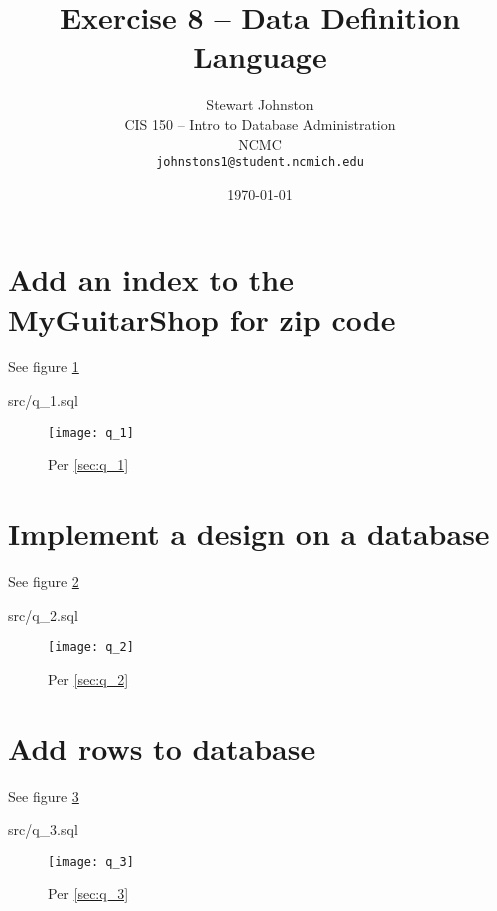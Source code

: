 \documentclass{article}
\title{Exercise 8 -- Data Definition Language}
\author{Stewart Johnston\\
  {CIS 150 -- Intro to Database Administration}\\
  {NCMC}\\
  {\texttt{johnstons1@student.ncmich.edu}}
}
\date{\today}
\begin{document}

\maketitle

\tableofcontents
\listoffigures

\section{Add an index to the MyGuitarShop for zip code}

See figure \ref{fig:q_1}
\label{sec:q_1}
\begin{lstinputlisting}[float]{src/q_1.sql}
\end{lstinputlisting}

\begin{figure}[H]\centering
	\caption{Per \ref{sec:q_1}}
	\texttt{[image: q\_1]}
	\label{fig:q_1}
\end{figure}

\section{Implement a design on a database}

See figure \ref{fig:q_2}
\label{sec:q_2}
\begin{lstinputlisting}[float]{src/q_2.sql}
\end{lstinputlisting}

\begin{figure}[H]\centering
	\caption{Per \ref{sec:q_2}}
	\texttt{[image: q\_2]}
	\label{fig:q_2}
\end{figure}

\section{Add rows to database}

See figure \ref{fig:q_3}
\label{sec:q_3}
\begin{lstinputlisting}[float]{src/q_3.sql}
\end{lstinputlisting}

\begin{figure}[H]\centering
	\caption{Per \ref{sec:q_3}}
	\texttt{[image: q\_3]}
	\label{fig:q_3}
\end{figure}
\end{document}
